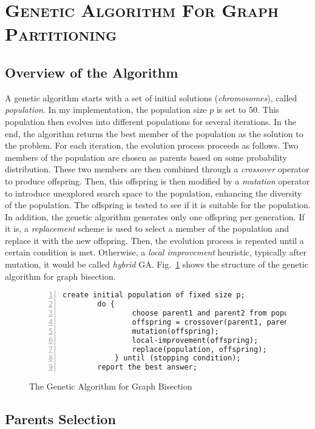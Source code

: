 \documentclass[11pt]{article}
\begin{document}
\section{\textsc{Genetic Algorithm For Graph Partitioning}}

\subsection{Overview of the Algorithm}

A genetic algorithm starts with a set of initial solutions (\textit{chromosomes}), called
\textit{population}. In my implementation, the population size \(p\) is set to \(50\). This 
population then evolves into different populations for several iterations. In the end, the algorithm
returns the best member of the population as the solution to the problem. For each iteration, the 
evolution process proceeds as follows. Two members of the population are chosen as parents based on
some probability distribution. These two members are then combined through a \textit{crossover} 
operator to produce offspring. Then, this offspring is then modified by a \textit{mutation} operator
to introduce unexplored search space to the population, enhancing the diversity of the population. 
The offspring is tested to see if it is suitable for the population. In addition, the genetic 
algorithm generates only one offspring per generation. If it is, a \textit{replacement} scheme is 
used to select a member of the population and replace it with the new offspring. Then, the evolution 
process is repeated until a certain condition is met. Otherwise, a \textit{local improvement} 
heuristic, typically after mutation, it would be called \textit{hybrid} GA. Fig.~\ref{alg:ga} shows 
the structure of the genetic algorithm for graph bisection.

\begin{figure}[H]
	\small
	\begin{Verbatim}[tabsize=4,xleftmargin=5mm,numbers=left]
		create initial population of fixed size p;
		do {
				choose parent1 and parent2 from population;
				offspring = crossover(parent1, parent2);
				mutation(offspring);
				local-improvement(offspring);
				replace(population, offspring);
			} until (stopping condition);
		report the best answer;
	\end{Verbatim}	
	\caption{The Genetic Algorithm for Graph Bisection}
	\label{alg:ga}
\end{figure}


\subsection{Parents Selection}
\end{document}
